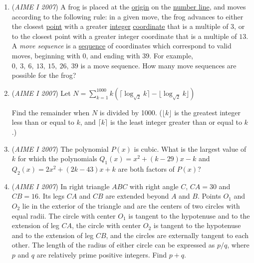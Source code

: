 \begin{enumerate}
 

	\item (\textit{AIME I 2007}) A frog is placed at the \href{https://artofproblemsolving.com/wiki/index.php?title=Origin}{origin} on the \href{https://artofproblemsolving.com/wiki/index.php?title=Number\_line}{number line}, and moves according to the following rule: in a given move, the frog advances to either the closest \href{https://artofproblemsolving.com/wiki/index.php?title=Point}{point} with a greater \href{https://artofproblemsolving.com/wiki/index.php?title=Integer}{integer} \href{https://artofproblemsolving.com/wiki/index.php?title=Coordinate}{coordinate} that is a multiple of $3$, or to the closest point with a greater integer coordinate that is a multiple of $13$. A \textit{move sequence} is a \href{https://artofproblemsolving.com/wiki/index.php?title=Sequence}{sequence} of coordinates which correspond to valid moves, beginning with $0$, and ending with $39$. For example, $0,\ 3,\ 6,\ 13,\ 15,\ 26,\ 39$ is a move sequence. How many move sequences are possible for the frog?


 

	\item (\textit{AIME I 2007}) Let 
$N = \sum_{k = 1}^{1000} k ( \lceil \log_{\sqrt{2}} k \rceil  - \lfloor \log_{\sqrt{2}} k \rfloor )$


 Find the remainder when $N$ is divided by 1000.  ($\lfloor{k}\rfloor$ is the greatest integer less than or equal to $k$, and $\lceil{k}\rceil$ is the least integer greater than or equal to $k$.)


 

	\item (\textit{AIME I 2007}) The polynomial $P(x)$ is cubic.  What is the largest value of $k$ for which the polynomials $Q_1(x) = x^2 + (k-29)x - k$ and $Q_2(x) = 2x^2+ (2k-43)x + k$ are both factors of $P(x)$?


 

	\item (\textit{AIME I 2007}) In right triangle $ABC$ with right angle $C$, $CA = 30$ and $CB = 16$.  Its legs $CA$ and $CB$ are extended beyond $A$ and $B$.  Points $O_1$ and $O_2$ lie in the exterior of the triangle and are the centers of two circles with equal radii.  The circle with center $O_1$ is tangent to the hypotenuse and to the extension of leg $CA$, the circle with center $O_2$ is tangent to the hypotenuse and to the extension of leg $CB$, and the circles are externally tangent to each other.  The length of the radius of either circle can be expressed as $p/q$, where $p$ and $q$ are relatively prime positive integers.  Find $p+q$.



\end{enumerate}
